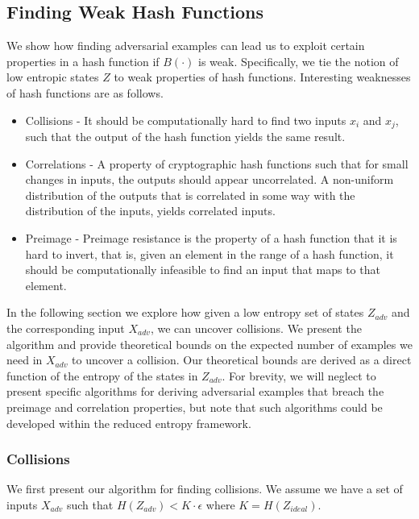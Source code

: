 \documentclass[letterpaper,twocolumn,10pt]{article}
\begin{document}
\subsection{Finding Weak Hash Functions}
We show how finding adversarial examples can lead us to exploit certain properties in a hash function if $B(\cdot)$ is weak. Specifically, we tie the notion of low entropic states $Z$ to weak properties of hash functions. Interesting weaknesses of hash functions are as follows.

\begin{itemize}
\item Collisions - It should be computationally hard to find two inputs $x_{i}$ and $x_{j}$, such that the output of the hash function yields the same result.
\item Correlations - A property of cryptographic hash functions such that for small changes in inputs, the outputs should appear uncorrelated. A non-uniform distribution of the outputs that is correlated in some way with the distribution of the inputs, yields correlated inputs. 
\item Preimage - Preimage resistance is the property of a hash function that it is hard to invert, that is, given an element in the range of a hash function, it should be computationally infeasible to find an input that maps to that element.
\end{itemize}

In the following section we explore how given a low entropy set of states $Z_{adv}$ and the corresponding input $X_{adv}$, we can uncover collisions. We present the algorithm and provide theoretical bounds on the expected number of examples we need in $X_{adv}$ to uncover a collision. Our theoretical bounds are derived as a direct function of the entropy of the states in $Z_{adv}$. For brevity, we will neglect to present specific algorithms for deriving adversarial examples that breach the  preimage and correlation properties, but note that such algorithms could be developed within the reduced entropy framework. 


\subsubsection{Collisions}
We first present our algorithm for finding collisions. We assume we have a set of inputs $X_{adv}$ such that $H(Z_{adv}) < K \cdot \epsilon$ where $K = H(Z_{ideal})$.
\end{document}
